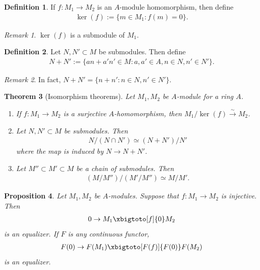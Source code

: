 \documentclass[12pt]{report}
\theoremstyle{plain}
\newtheorem{theorem}{Theorem}[section]
\newtheorem{proposition}[theorem]{Proposition}
\theoremstyle{remark}
\newtheorem*{remark}{Remark}
\theoremstyle{definition}
\newtheorem{definition}[theorem]{Definition}
\begin{document}
\begin{definition}
    If $f:M_1\rightarrow M_2$ is an $A$-module homomorphism, then define
    \begin{align*}
        \ker (f) := \{m\in M_1 : f(m)=0\}.
    \end{align*}
\end{definition}
\begin{remark}
    $\ker(f)$ is a submodule of $M_1$.
\end{remark}

\begin{definition}
    Let $N,N'\subset M$ be submodules. Then define
    \begin{align*}
        N+N' := \{an+a'n'\in M:a,a'\in A,n\in N,n'\in N'\}.
    \end{align*}
\end{definition}
\begin{remark}
    In fact, $N+N' = \{n+n':n\in N,n'\in N'\}$.
\end{remark}

\begin{theorem}[Isomorphism theorems]
    Let $M_1,M_2$ be $A$-module for a ring $A$.
    \begin{enumerate}
        \item If $f:M_1\rightarrow M_2$ is a surjective $A$-homomorphism, then $M_1/\ker(f) \stackrel{\sim}{\rightarrow} M_2$.
        \item Let $N,N'\subset M$ be submodules. Then
        \begin{align*}
            N/(N\cap N') \simeq (N+N')/N'
        \end{align*}
        where the map is induced by $N\rightarrow N+N'$.
        \item Let $M''\subset M'\subset M$ be a chain of submodules. Then
        \begin{align*}
            (M/M'') / (M'/M'') \simeq M/M'.
        \end{align*}
    \end{enumerate}
\end{theorem}

\begin{proposition}
    Let $M_1,M_2$ be $A$-modules. Suppose that $f:M_1\rightarrow M_2$ is injective. Then
    \begin{align*}
        0 \rightarrow M_1 \xbigtoto[f]{0} M_2
    \end{align*}
    is an equalizer. If $F$ is any continuous functor,
    \begin{align*}
        F(0) \rightarrow F(M_1) \xbigtoto[F(f)]{F(0)} F(M_2)
    \end{align*}
    is an equalizer.
\end{proposition}
\end{document}
